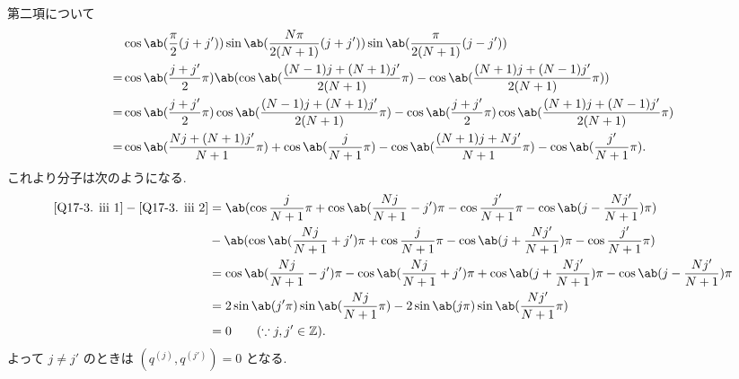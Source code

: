 \documentclass[uplatex,diffipdfmx,a4paper,11pt]{jlreq}
\newcommand{\ZZ}{\mathbb{Z}}
\theoremstyle{definition}
\begin{document}
第二項について
\begin{align}
    & \cos\ab(\frac{\pi}{2}(j + j'))\sin\ab(\frac{N\pi}{2(N+1)}(j + j'))\sin\ab(\frac{\pi}{2(N+1)}(j - j'))                                                      \\
  = & \cos\ab(\frac{j + j'}{2}\pi)\ab(\cos\ab(\frac{(N-1)j + (N+1)j'}{2(N+1)}\pi) - \cos\ab(\frac{(N+1)j + (N-1)j'}{2(N+1)}\pi))                                 \\
  = & \cos\ab(\frac{j + j'}{2}\pi)\cos\ab(\frac{(N-1)j + (N+1)j'}{2(N+1)}\pi) - \cos\ab(\frac{j + j'}{2}\pi)\cos\ab(\frac{(N+1)j + (N-1)j'}{2(N+1)}\pi)          \\
  = & \cos\ab(\frac{Nj + (N+1)j'}{N+1}\pi) + \cos\ab(\frac{j}{N+1}\pi) - \cos\ab(\frac{(N+1)j + Nj'}{N+1}\pi) - \cos\ab(\frac{j'}{N+1}\pi). \label{Q17-3. iii 2}
\end{align}
これより分子は次のようになる.
\begin{align}
  \eqref{Q17-3. iii 1} - \eqref{Q17-3. iii 2} & = \ab(\cos\frac{j}{N+1}\pi + \cos\ab(\frac{Nj}{N+1} - j')\pi - \cos\frac{j'}{N+1}\pi - \cos\ab(j - \frac{Nj'}{N+1})\pi)                 \\
                                              & - \ab(\cos\ab(\frac{Nj}{N+1} + j')\pi + \cos\frac{j}{N+1}\pi - \cos\ab(j + \frac{Nj'}{N+1})\pi - \cos\frac{j'}{N+1}\pi)                 \\
                                              & = \cos\ab(\frac{Nj}{N+1} - j')\pi - \cos\ab(\frac{Nj}{N+1} + j')\pi + \cos\ab(j + \frac{Nj'}{N+1})\pi - \cos\ab(j - \frac{Nj'}{N+1})\pi \\
                                              & = 2\sin\ab(j'\pi)\sin\ab(\frac{Nj}{N+1}\pi) - 2\sin\ab(j\pi)\sin\ab(\frac{Nj'}{N+1}\pi)                                                 \\
                                              & = 0 \qquad (\because j, j'\in\ZZ).
\end{align}
よって $j \neq j'$ のときは $(q^{(j)}, q^{(j')}) = 0$ となる.
\end{document}
